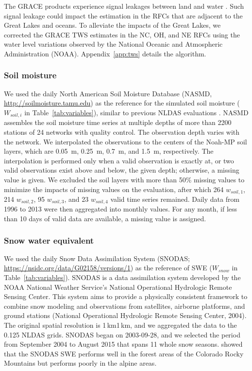 \documentclass[essd, manuscript]{copernicus}
\begin{document}
The GRACE products experience signal leakages between land and water \citep{save2016JGRSE}. Such signal leakage could impact the estimation in the RFCs that are adjacent to the Great Lakes \citep{ma2017JGRA} and oceans. To alleviate the impacts of the Great Lakes, we corrected the GRACE TWS estimates in the NC, OH, and NE RFCs using the water level variations observed by the National Oceanic and Atmospheric Administration (NOAA). Appendix~\ref{app:tws} details the algorithm.

\subsubsection{Soil moisture}\label{sec:methods:ref:sm}

We used the daily North American Soil Moisture Database (NASMD, \url{http://soilmoisture.tamu.edu}) \citep{quiring2016BAMS} as the reference for the simulated soil moisture (\(W_{soil,i}\) in Table~\ref{tab:variables}), similar to previous NLDAS evaluations \citep{xia2015JHa, xia2015JH}. NASMD assembles the soil moisture time series at multiple depths of more than 2200 stations of 24 networks with quality control. The observation depth varies with the network. We interpolated the observations to the centers of the Noah-MP soil layers, which are \qty{0.05}{m}, \qty{0.25}{m}, \qty{0.7}{m}, and \qty{1.5}{m}, respectively. The interpolation is performed only when a valid observation is exactly at, or two valid observations exist above and below, the given depth; otherwise, a missing value is given. We excluded the soil layers with more than 50\% missing values to minimize the impacts of missing values on the evaluation, after which 264 \(w_{soil,1}\), 214 \(w_{soil,2}\), 95 \(w_{soil,3}\), and 23 \(w_{soil,4}\) valid time series remained. Daily data from 1996 to 2013 were then aggregated into monthly values. For any month, if less than 10 days of valid data are available, a missing value is assigned.

\subsubsection{Snow water equivalent}

We used the daily Snow Data Assimilation System (SNODAS; \url{https://nsidc.org/data/G02158/versions/1}) as the reference of SWE (\(W_{snow}\) in Table~\ref{tab:variables}). SNODAS is a data assimilation system developed by the NOAA National Weather Service's National Operational Hydrologic Remote Sensing Center. This system aims to provide a physically consistent framework to combine snow modeling and observations from satellites, airborne platforms, and ground stations (National Operational Hydrologic Remote Sensing Center, 2004). The original spatial resolution is 1\,km\times{}1\,km, and we aggregated the data to the 0.125\degree{} NLDAS grids. SNODAS began on 2003-09-28, and we selected the period from September 2004 to August 2015 that spans 11 whole snow seasons. \citet{clow2012HP} showed that the SNODAS SWE performs well in the forest areas of the Colorado Rocky Mountains but performs poorly in the alpine areas.
\end{document}
